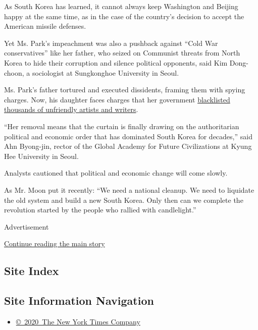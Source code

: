 As South Korea has learned, it cannot always keep Washington and Beijing
happy at the same time, as in the case of the country's decision to
accept the American missile defenses.

Yet Ms. Park's impeachment was also a pushback against ``Cold War
conservatives'' like her father, who seized on Communist threats from
North Korea to hide their corruption and silence political opponents,
said Kim Dong-choon, a sociologist at Sungkonghoe University in Seoul.

Ms. Park's father tortured and executed dissidents, framing them with
spying charges. Now, his daughter faces charges that her government
\href{https://www.nytimes3xbfgragh.onion/2017/01/12/world/asia/south\%2Dkorea\%2Dpresident\%2Dpark\%2Dblacklist\%2Dartists.html}{blacklisted
thousands of unfriendly artists and writers}.

``Her removal means that the curtain is finally drawing on the
authoritarian political and economic order that has dominated South
Korea for decades,'' said Ahn Byong-jin, rector of the Global Academy
for Future Civilizations at Kyung Hee University in Seoul.

Analysts cautioned that political and economic change will come slowly.

As Mr. Moon put it recently: ``We need a national cleanup. We need to
liquidate the old system and build a new South Korea. Only then can we
complete the revolution started by the people who rallied with
candlelight.''

Advertisement

\protect\hyperlink{after-bottom}{Continue reading the main story}

\hypertarget{site-index}{%
\subsection{Site Index}\label{site-index}}

\hypertarget{site-information-navigation}{%
\subsection{Site Information
Navigation}\label{site-information-navigation}}

\begin{itemize}
\tightlist
\item
  \href{https://help.nytimes3xbfgragh.onion/hc/en-us/articles/115014792127-Copyright-notice}{©~2020~The
  New York Times Company}
\end{itemize}

